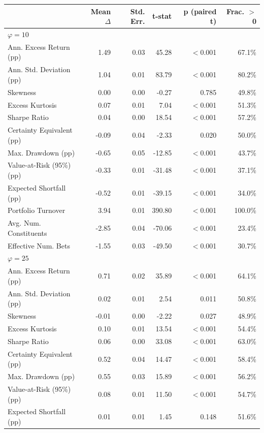 \begin{tabular*}{\textwidth}{l@{\extracolsep{\fill}}rrrrr}
\toprule
 & Mean $\Delta$ & Std. Err. & t-stat & p (paired t) & Frac. $>$ 0 \\
\midrule
\multicolumn{6}{l}{\textit{$\varphi = 10$}} \\
\midrule
Ann. Excess Return (pp) & 1.49 & 0.03 & 45.28 & $<$0.001 & 67.1\% \\
Ann. Std. Deviation (pp) & 1.04 & 0.01 & 83.79 & $<$0.001 & 80.2\% \\
Skewness & 0.00 & 0.00 & -0.27 & 0.785 & 49.8\% \\
Excess Kurtosis & 0.07 & 0.01 & 7.04 & $<$0.001 & 51.3\% \\
Sharpe Ratio & 0.04 & 0.00 & 18.54 & $<$0.001 & 57.2\% \\
Certainty Equivalent (pp) & -0.09 & 0.04 & -2.33 & 0.020 & 50.0\% \\
Max. Drawdown (pp) & -0.65 & 0.05 & -12.85 & $<$0.001 & 43.7\% \\
Value-at-Risk (95\%) (pp) & -0.33 & 0.01 & -31.48 & $<$0.001 & 37.1\% \\
Expected Shortfall (pp) & -0.52 & 0.01 & -39.15 & $<$0.001 & 34.0\% \\
Portfolio Turnover & 3.94 & 0.01 & 390.80 & $<$0.001 & 100.0\% \\
Avg. Num. Constituents & -2.85 & 0.04 & -70.06 & $<$0.001 & 23.4\% \\
Effective Num. Bets & -1.55 & 0.03 & -49.50 & $<$0.001 & 30.7\% \\
\midrule
\multicolumn{6}{l}{\textit{$\varphi = 25$}} \\
\midrule
Ann. Excess Return (pp) & 0.71 & 0.02 & 35.89 & $<$0.001 & 64.1\% \\
Ann. Std. Deviation (pp) & 0.02 & 0.01 & 2.54 & 0.011 & 50.8\% \\
Skewness & -0.01 & 0.00 & -2.22 & 0.027 & 48.9\% \\
Excess Kurtosis & 0.10 & 0.01 & 13.54 & $<$0.001 & 54.4\% \\
Sharpe Ratio & 0.06 & 0.00 & 33.08 & $<$0.001 & 63.0\% \\
Certainty Equivalent (pp) & 0.52 & 0.04 & 14.47 & $<$0.001 & 58.4\% \\
Max. Drawdown (pp) & 0.55 & 0.03 & 15.89 & $<$0.001 & 56.2\% \\
Value-at-Risk (95\%) (pp) & 0.08 & 0.01 & 11.50 & $<$0.001 & 54.7\% \\
Expected Shortfall (pp) & 0.01 & 0.01 & 1.45 & 0.148 & 51.6\% \\

\end{tabular*}
